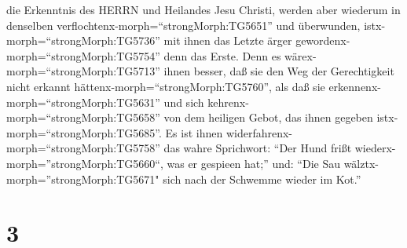 die Erkenntnis des HERRN und Heilandes Jesu Christi, werden aber
wiederum in denselben verflochtenx-morph=``strongMorph:TG5651'' und
überwunden, istx-morph=``strongMorph:TG5736'' mit ihnen das Letzte ärger
gewordenx-morph=``strongMorph:TG5754'' denn das Erste. 
Denn es wärex-morph=``strongMorph:TG5713'' ihnen besser, daß sie den Weg
der Gerechtigkeit nicht erkannt hättenx-morph=``strongMorph:TG5760'',
als daß sie erkennenx-morph=``strongMorph:TG5631'' und sich
kehrenx-morph=``strongMorph:TG5658'' von dem heiligen Gebot, das ihnen
gegeben istx-morph=``strongMorph:TG5685''.  Es ist ihnen
widerfahrenx-morph=``strongMorph:TG5758'' das wahre Sprichwort: ``Der
Hund frißt wiederx-morph=''strongMorph:TG5660``, was er gespieen hat;''
und: ``Die Sau wälztx-morph=''strongMorph:TG5671" sich nach der Schwemme
wieder im Kot.''

\hypertarget{section-2}{%
\section{3}\label{section-2}}

